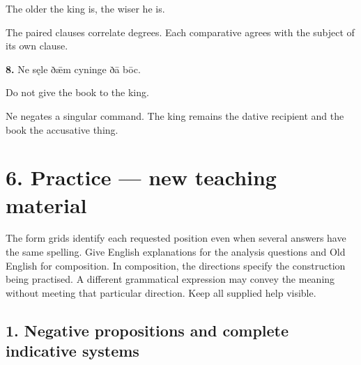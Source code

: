 The older the king is, the wiser he is.

The paired clauses correlate degrees. Each comparative agrees with the subject of its own clause.

\textbf{8.} Ne sęle ðǣm cyninge ðā bōc.

Do not give the book to the king.

Ne negates a singular command. The king remains the dative recipient and the book the accusative thing.

\section*{6. Practice — new teaching material}

The form grids identify each requested position even when several answers have the same spelling. Give English explanations for the analysis questions and Old English for composition. In composition, the directions specify the construction being practised. A different grammatical expression may convey the meaning without meeting that particular direction. Keep all supplied help visible.

\subsection*{1. Negative propositions and complete indicative systems}

